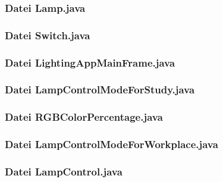 \documentclass[11pt,ngerman]{article}
\begin{document}
\subsubsection{Datei Lamp.java}

\vspace{.5cm}

\subsubsection{Datei Switch.java}

\vspace{.5cm}

\subsubsection{Datei LightingAppMainFrame.java}

\vspace{.5cm}

\subsubsection{Datei LampControlModeForStudy.java}

\vspace{.5cm}

\subsubsection{Datei RGBColorPercentage.java}

\vspace{.5cm}

\subsubsection{Datei LampControlModeForWorkplace.java}

\vspace{.5cm}

\subsubsection{Datei LampControl.java}

\vspace{.5cm}
\end{document}
